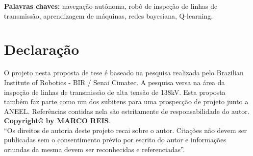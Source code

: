 \vspace*{1cm}
\noindent \textbf{Palavras chaves: }navegação autônoma, robô de inspeção de linhas de transmissão, aprendizagem de máquinas, redes bayesiana, Q-learning.


\chapter*{Declaração}
O projeto nesta proposta de tese é baseado na pesquisa realizada pelo Brazilian Institute of Robotics - BIR / Senai Cimatec. A pesquisa versa na área da inspeção de linhas de transmissão de alta tensão de 138kV. Esta proposta também faz parte como um dos subitens para uma prospecção de projeto junto a ANEEL. Referências contidas nela são estritamente de responsabilidade do autor.\\
\vspace*{8cm}
\vfill
\noindent \textbf{Copyright\copyright{} by MARCO REIS}.\\
``Os direitos de autoria deste projeto recai sobre o autor. Citações não devem ser publicadas sem o consentimento prévio por escrito do autor e informações oriundas da mesma devem ser reconhecidas e referenciadas''.




